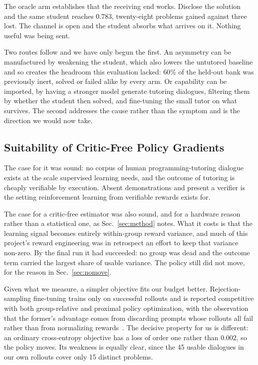 \documentclass[conference]{IEEEtran}
\begin{document}
The oracle arm establishes that the receiving end works. Disclose the solution
and the same student reaches $0.783$, twenty-eight problems gained against
three lost. The channel is open and the student absorbs what arrives on it.
Nothing useful was being sent.

Two routes follow and we have only begun the first. An asymmetry can be
manufactured by weakening the student, which also lowers the untutored baseline
and so creates the headroom this evaluation lacked: $60\%$ of the held-out bank
was previously inert, solved or failed alike by every arm. Or capability can be
imported, by having a stronger model generate tutoring dialogues, filtering
them by whether the student then solved, and fine-tuning the small tutor on
what survives. The second addresses the cause rather than the symptom and is
the direction we would now take.

\subsection{Suitability of Critic-Free Policy Gradients}
\label{sec:method-choice}

The case for it was sound: no corpus of human programming-tutoring dialogue
exists at the scale supervised learning needs, and the outcome of tutoring is
cheaply verifiable by execution. Absent demonstrations and present a verifier
is the setting reinforcement learning from verifiable rewards exists for.

The case for a critic-free estimator was also sound, and for a hardware reason
rather than a statistical one, as Sec.~\ref{sec:method} notes. What it costs is
that the learning signal becomes entirely within-group reward variance, and
much of this project's reward engineering was in retrospect an effort to keep
that variance non-zero. By the final run it had succeeded: no group was dead
and the outcome term carried the largest share of usable variance. The policy
still did not move, for the reason in Sec.~\ref{sec:nomove}.

Given what we measure, a simpler objective fits our budget better.
Rejection-sampling fine-tuning trains only on successful rollouts and is
reported competitive with both group-relative and proximal policy
optimization, with the observation that the former's advantage comes from
discarding prompts whose rollouts all fail rather than from normalizing
rewards~\cite{raft}. The decisive property for us is different: an ordinary
cross-entropy objective has a loss of order one rather than $0.002$, so the
policy moves. Its weakness is equally clear, since the 45 usable dialogues in
our own rollouts cover only 15 distinct problems.
\end{document}
